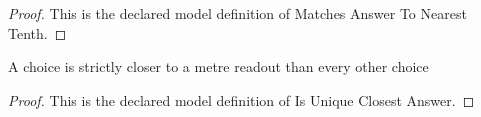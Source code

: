 \begin{proof}
  This is the declared model definition of Matches Answer To Nearest Tenth.
\end{proof}
\begin{definition}
  \label{def:physics:phyx-mini-0676:phyxminiproblems-problemphyxmini0676-isuniqueclosestanswer}
  A choice is strictly closer to a metre readout than every other choice
\end{definition}
\begin{proof}
  This is the declared model definition of Is Unique Closest Answer.
\end{proof}
